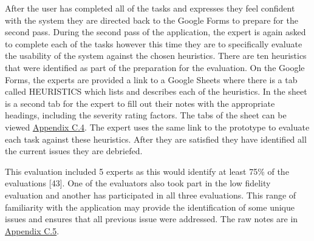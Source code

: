 \documentclass[a4 paper, 12pt]{article}
\begin{document}
    After the user has completed all of the tasks and expresses they feel confident with the system they are directed back to the Google Forms to prepare for the second pass. During the second pass of the application, the expert is again asked to complete each of the tasks however this time they are to specifically evaluate the usability of the system against the chosen heuristics. There are ten heuristics that were identified as part of the preparation for the evaluation. On the Google Forms, the experts are provided a link to a Google Sheets where there is a tab called HEURISTICS which lists and describes each of the heuristics. In the sheet is a second tab for the expert to fill out their notes with the appropriate headings, including the severity rating factors. The tabs of the sheet can be viewed \hyperref[sec:C.4]{Appendix C.4}. The expert uses the same link to the prototype to evaluate each task against these heuristics. After they are satisfied they have identified all the current issues they are debriefed.
    
    This evaluation included 5 experts as this would identify at least 75\% of the evaluations [43]. One of the evaluators also took part in the low fidelity evaluation and another has participated in all three evaluations. This range of familiarity with the application may provide the identification of some unique issues and ensures that all previous issue were addressed. The raw notes are in \hyperref[sec:C.5]{Appendix C.5}. 
\end{document}
